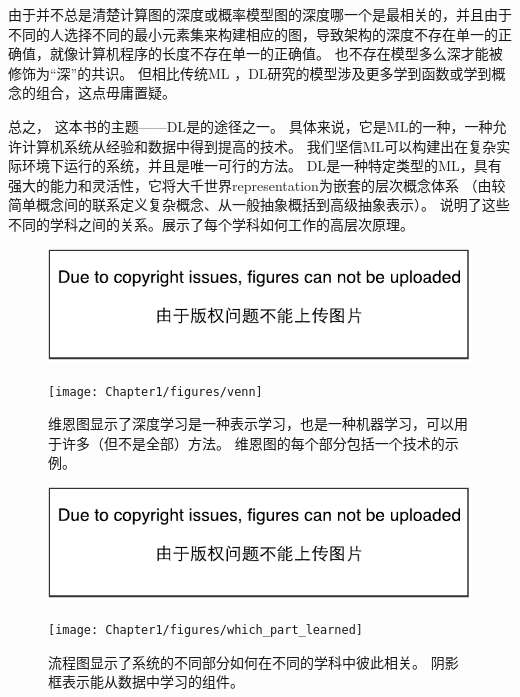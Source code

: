 
由于并不总是清楚计算图的深度或概率模型图的深度哪一个是最相关的，并且由于不同的人选择不同的最小元素集来构建相应的图，导致架构的深度不存在单一的正确值，就像计算机程序的长度不存在单一的正确值。
也不存在模型多么深才能被修饰为``深''的共识。
但相比传统\gls{ML} ，\gls{DL}研究的模型涉及更多学到函数或学到概念的组合，这点毋庸置疑。

总之， 这本书的主题——\gls{DL}是的途径之一。
具体来说，它是\gls{ML}的一种，一种允许计算机系统从经验和数据中得到提高的技术。
我们坚信\gls{ML}可以构建出在复杂实际环境下运行的系统，并且是唯一可行的方法。
\gls{DL}是一种特定类型的\gls{ML}，具有强大的能力和灵活性，它将大千世界\gls{representation}为嵌套的层次概念体系
（由较简单概念间的联系定义复杂概念、从一般抽象概括到高级抽象表示）。
说明了这些不同的学科之间的关系。展示了每个学科如何工作的高层次原理。
\begin{figure}[!hbt]
\ifOpenSource
\centerline{\includegraphics{figure.pdf}}
\else
\centerline{\texttt{[image: Chapter1/figures/venn]}}
\fi
\caption{维恩图显示了深度学习是一种表示学习，也是一种机器学习，可以用于许多（但不是全部）方法。
维恩图的每个部分包括一个技术的示例。
}
\label{fig:chap1_venn}
\end{figure}

\begin{figure}[!htb]
\ifOpenSource
\centerline{\includegraphics{figure.pdf}}
\else
\centerline{\texttt{[image: Chapter1/figures/which\_part\_learned]}}
\fi
\caption{流程图显示了系统的不同部分如何在不同的学科中彼此相关。
阴影框表示能从数据中学习的组件。}
\label{fig:chap1_which_part_learned}
\end{figure}

